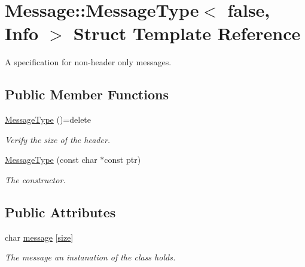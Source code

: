 \hypertarget{struct_message_1_1_message_type_3_01false_00_01_info_01_4}{}\section{Message\+:\+:Message\+Type$<$ false, Info $>$ Struct Template Reference}
\label{struct_message_1_1_message_type_3_01false_00_01_info_01_4}


A specification for non-\/header only messages.  


\subsection*{Public Member Functions}
\begin{DoxyCompactItemize}
\item 
\hyperlink{struct_message_1_1_message_type_3_01false_00_01_info_01_4_a04fccf2c4ae16dded9efa697c7f2885f}{Message\+Type} ()=delete
\begin{DoxyCompactList}\small\item\em Verify the size of the header. \end{DoxyCompactList}\item 
\hyperlink{struct_message_1_1_message_type_3_01false_00_01_info_01_4_af6312418240388ee671582bb3eb8ba64}{Message\+Type} (const char $\ast$const ptr)
\begin{DoxyCompactList}\small\item\em The constructor. \end{DoxyCompactList}\end{DoxyCompactItemize}
\subsection*{Public Attributes}
\begin{DoxyCompactItemize}
\item 
char \hyperlink{struct_message_1_1_message_type_3_01false_00_01_info_01_4_af9557cb65a7883b01c7cbe30e6211f98}{message} \mbox{[}\hyperlink{struct_message_1_1_message_type_3_01false_00_01_info_01_4_ab1478611666e0b38703dbb0512262d32}{size}\mbox{]}
\begin{DoxyCompactList}\small\item\em The message an instanation of the class holds. \end{DoxyCompactList}\end{DoxyCompactItemize}
